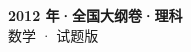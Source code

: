 \documentclass[zihao=-4, a4paper]{ctexart}
\begin{document}
\begin{center}
  {\Large\bfseries 2012 年·全国大纲卷·理科}\\[4pt]
  {\large 数学 · 试题版}
\end{center}
\medskip
{}

\end{document}
